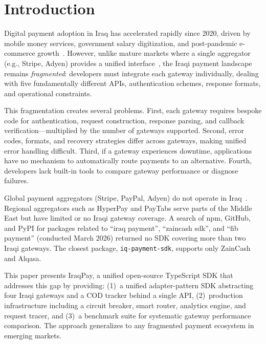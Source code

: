 \documentclass[10pt, a4paper, oneside]{article}
\begin{document}
{\selectfont
\begin{doi}
{\fontsize{9pt}{9pt}\selectfont{
10.3897/jucs.\textless SubmissionNumber\textgreater}}
\end{doi}}


\section{Introduction}

Digital payment adoption in Iraq has accelerated rapidly since 2020, driven by mobile money services, government salary digitization, and post-pandemic e-commerce growth~\cite{gsma2023}. However, unlike mature markets where a single aggregator (e.g., Stripe, Adyen) provides a unified interface~\cite{stripe2023}, the Iraqi payment landscape remains \emph{fragmented}: developers must integrate each gateway individually, dealing with five fundamentally different APIs, authentication schemes, response formats, and operational constraints.

This fragmentation creates several problems. First, each gateway requires bespoke code for authentication, request construction, response parsing, and callback verification---multiplied by the number of gateways supported. Second, error codes, formats, and recovery strategies differ across gateways, making unified error handling difficult. Third, if a gateway experiences downtime, applications have no mechanism to automatically route payments to an alternative. Fourth, developers lack built-in tools to compare gateway performance or diagnose failures.

Global payment aggregators (Stripe, PayPal, Adyen) do not operate in Iraq~\cite{worldbank2023}. Regional aggregators such as HyperPay and PayTabs serve parts of the Middle East but have limited or no Iraqi gateway coverage. A search of npm, GitHub, and PyPI for packages related to ``iraq payment'', ``zaincash sdk'', and ``fib payment'' (conducted March 2026) returned no SDK covering more than two Iraqi gateways. The closest package, \texttt{iq-payment-sdk}, supports only ZainCash and Alqasa.

This paper presents IraqPay, a unified open-source TypeScript SDK that addresses this gap by providing: (1)~a unified adapter-pattern SDK abstracting four Iraqi gateways and a COD tracker behind a single API, (2)~production infrastructure including a circuit breaker, smart router, analytics engine, and request tracer, and (3)~a benchmark suite for systematic gateway performance comparison. The approach generalizes to any fragmented payment ecosystem in emerging markets.
\end{document}
